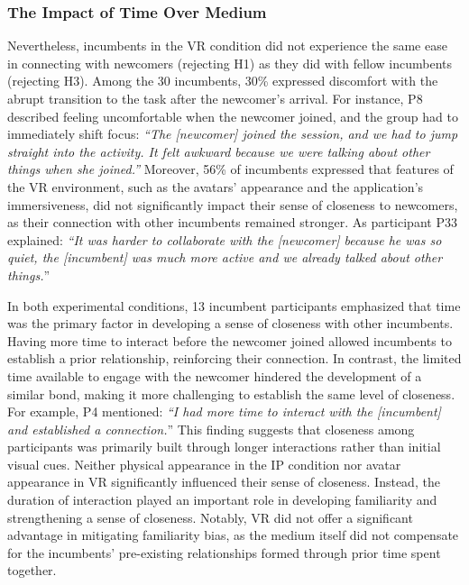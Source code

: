 \subsubsection{The Impact of Time Over Medium}
Nevertheless, incumbents in the VR condition did not experience the same ease in connecting with newcomers (rejecting H1) as they did with fellow incumbents (rejecting H3). Among the 30 incumbents, 30\% expressed discomfort with the abrupt transition to the task after the newcomer's arrival. For instance, P8 described feeling uncomfortable when the newcomer joined, and the group had to immediately shift focus: \textit{``The [newcomer] joined the session, and we had to jump straight into the activity. It felt awkward because we were talking about other things when she joined.''} Moreover, 56\% of incumbents expressed that features of the VR environment, such as the avatars' appearance and the application's immersiveness, did not significantly impact their sense of closeness to newcomers, as their connection with other incumbents remained stronger. As participant P33 explained: \textit{``It was harder to collaborate with the [newcomer] because he was so quiet, the [incumbent] was much more active and we already talked about other things.}''

In both experimental conditions, 13 incumbent participants emphasized that time was the primary factor in developing a sense of closeness with other incumbents. Having more time to interact before the newcomer joined allowed incumbents to establish a prior relationship, reinforcing their connection. In contrast, the limited time available to engage with the newcomer hindered the development of a similar bond, making it more challenging to establish the same level of closeness. For example, P4 mentioned: \textit{``I had more time to interact with the [incumbent] and established a connection.}'' This finding suggests that closeness among participants was primarily built through longer interactions rather than initial visual cues. Neither physical appearance in the IP condition nor avatar appearance in VR significantly influenced their sense of closeness. Instead, the duration of interaction played an important role in developing familiarity and strengthening a sense of closeness. Notably, VR did not offer a significant advantage in mitigating familiarity bias, as the medium itself did not compensate for the incumbents' pre-existing relationships formed through prior time spent together.

